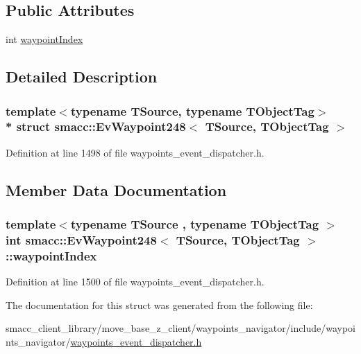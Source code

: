 \subsection*{Public Attributes}
\begin{DoxyCompactItemize}
\item 
int \hyperlink{structsmacc_1_1EvWaypoint248_ae37e3ac6a61e8a4728dc3aab489966c4}{waypoint\+Index}
\end{DoxyCompactItemize}


\subsection{Detailed Description}
\subsubsection*{template$<$typename T\+Source, typename T\+Object\+Tag$>$\\*
struct smacc\+::\+Ev\+Waypoint248$<$ T\+Source, T\+Object\+Tag $>$}



Definition at line 1498 of file waypoints\+\_\+event\+\_\+dispatcher.\+h.



\subsection{Member Data Documentation}
\subsubsection[{\texorpdfstring{waypoint\+Index}{waypointIndex}}]{\setlength{\rightskip}{0pt plus 5cm}template$<$typename T\+Source , typename T\+Object\+Tag $>$ int {\bf smacc\+::\+Ev\+Waypoint248}$<$ T\+Source, T\+Object\+Tag $>$\+::waypoint\+Index}\hypertarget{structsmacc_1_1EvWaypoint248_ae37e3ac6a61e8a4728dc3aab489966c4}{}\label{structsmacc_1_1EvWaypoint248_ae37e3ac6a61e8a4728dc3aab489966c4}


Definition at line 1500 of file waypoints\+\_\+event\+\_\+dispatcher.\+h.



The documentation for this struct was generated from the following file\+:\begin{DoxyCompactItemize}
\item 
smacc\+\_\+client\+\_\+library/move\+\_\+base\+\_\+z\+\_\+client/waypoints\+\_\+navigator/include/waypoints\+\_\+navigator/\hyperlink{waypoints__event__dispatcher_8h}{waypoints\+\_\+event\+\_\+dispatcher.\+h}\end{DoxyCompactItemize}
